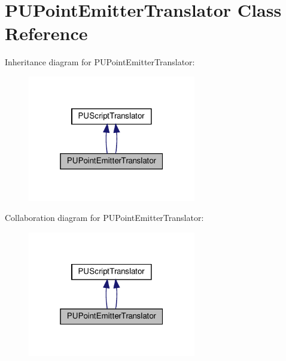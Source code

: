 \hypertarget{classPUPointEmitterTranslator}{}\section{P\+U\+Point\+Emitter\+Translator Class Reference}
\label{classPUPointEmitterTranslator}


Inheritance diagram for P\+U\+Point\+Emitter\+Translator\+:
\nopagebreak
\begin{figure}[H]
\begin{center}
\leavevmode
\includegraphics[width=208pt]{classPUPointEmitterTranslator__inherit__graph}
\end{center}
\end{figure}


Collaboration diagram for P\+U\+Point\+Emitter\+Translator\+:
\nopagebreak
\begin{figure}[H]
\begin{center}
\leavevmode
\includegraphics[width=208pt]{classPUPointEmitterTranslator__coll__graph}
\end{center}
\end{figure}
